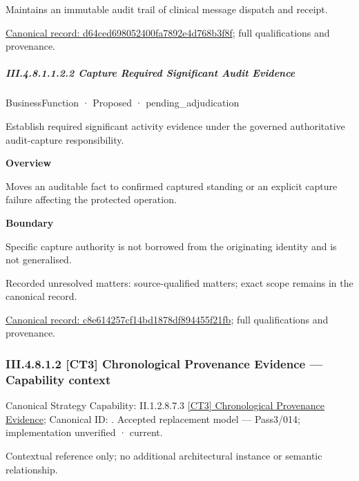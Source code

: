 Maintains an immutable audit trail of clinical message dispatch and receipt.


{\footnotesize \href{../../../../continuum/business/business-function/d64ced698052400fa7892e4d768b3f8f.md}{Canonical record: d64ced698052400fa7892e4d768b3f8f}; full qualifications and provenance.}\par
\subparagraph*{III.4.8.1.1.2.2 Capture Required Significant Audit Evidence}
\label{navigation:III.4.8.1.1.2.2}

\label{element:c8e614257cf14bd1878df894455f21fb}
{\small BusinessFunction · Proposed · pending\_adjudication}\par

Establish required significant activity evidence under the governed authoritative audit-capture responsibility.



\textbf{Overview}



Moves an auditable fact to confirmed captured standing or an explicit capture failure affecting the protected operation.



\textbf{Boundary}



Specific capture authority is not borrowed from the originating identity and is not generalised.


{\small Recorded unresolved matters: source-qualified matters; exact scope remains in the canonical record.}\par
{\footnotesize \href{../../../../continuum/business/business-function/c8e614257cf14bd1878df894455f21fb.md}{Canonical record: c8e614257cf14bd1878df894455f21fb}; full qualifications and provenance.}\par
\subsubsection*{III.4.8.1.2 [CT3] Chronological Provenance Evidence — Capability context}
\label{navigation:III.4.8.1.2}

{\small Canonical Strategy Capability: II.1.2.8.7.3 \hyperref[element:95c06dba5448453992d55106b19f977d]{[CT3] Chronological Provenance Evidence}; Canonical ID: \texttt{}. Accepted replacement model — Pass3/014; implementation unverified · current.}\par
Contextual reference only; no additional architectural instance or semantic relationship.\par
